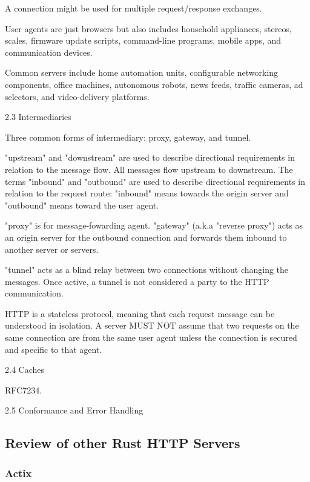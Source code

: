 \documentclass[12pt, a4paper]{article}
\begin{document}
A connection might be used for multiple request/response exchanges.

User agents are just browsers but also includes household appliances, stereos, scales, firmware
update scripts, command-line programs, mobile apps, and communication devices.

Common servers include home automation units, configurable networking components, office machines,
autonomous robots, news feeds, traffic cameras, ad selectors, and video-delivery platforms.

2.3 Intermediaries

Three common forms of intermediary: proxy, gateway, and tunnel.

"upstream" and "downstream" are used to describe directional requirements in relation to the
message flow. All messages flow upstream to downstream. The terms "inbound" and "outbound" are
used to describe directional requirements in relation to the request route: "inbound" means
towards the origin server and "outbound" means toward the user agent.

"proxy" is for message-fowarding agent.
"gateway" (a.k.a "reverse proxy") acts as an origin server for the outbound connection and
forwards them inbound to another server or servers.

"tunnel" acts as a blind relay between two connections without changing the messages.
Once active, a tunnel is not considered a party to the HTTP communication.

HTTP is a stateless protocol, meaning that each request message can be understood in isolation.
A server MUST NOT assume that two requests on the same connection are from the same user
agent unless the connection is secured and specific to that agent.

2.4 Caches

RFC7234.

2.5 Conformance and Error Handling


\subsection{Review of other Rust HTTP Servers}

\subsubsection{Actix}

    
\newpage
\printbibliography
\end{document}
